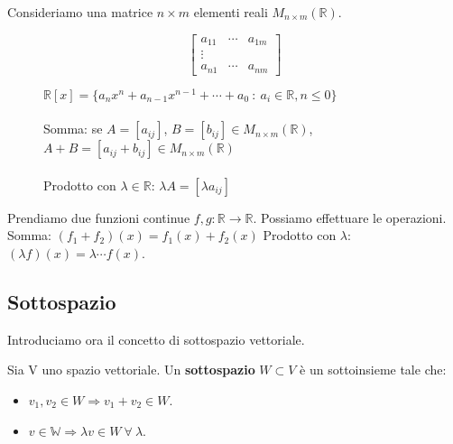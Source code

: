 \begin{example}
Consideriamo una matrice $n \times m$ elementi reali $M_{n\times m}(\mathbb{R})$.
\begin{figure}[h!]
    \begin{minipage}{.2\linewidth}
    \vspace{-10pt}
    \centering
    \[
    \begin{bmatrix}
    a_{11} & \cdots & a_{1m}\\
    \vdots \\
    a_{n1} & \cdots & a_{nm}
    \end{bmatrix}
    \]
    \end{minipage}
    \begin{minipage}{.75\linewidth}
    $\mathbb{R}[x] = \{a_nx^n + a_{n-1}x^{n-1} + \cdots + a_0 \: : \: a_i \in \mathbb{R}, n \leq 0\}$\\\\
    Somma: se $A = [a_{ij}]$, $B = [b_{ij}] \in M_{n\times m}(\mathbb{R})$, $A + B = [a_{ij} + b_{ij}] \in M_{n\times m}(\mathbb{R})$\\\\
    Prodotto con $\lambda \in \mathbb{R}$: $\lambda A = [\lambda a_{ij}]$
    \end{minipage}
\end{figure}
\end{example}

\begin{example}
Prendiamo due funzioni continue $f, g: \mathbb{R}\to \mathbb{R}$. Possiamo effettuare le operazioni.
Somma: $(f_1 + f_2)(x) = f_1(x) + f_2(x)$ \hspace{.3cm} Prodotto con $\lambda$: $(\lambda f)(x) = \lambda \cdots f(x)$.
\end{example}

\subsection{Sottospazio}
Introduciamo ora il concetto di sottospazio vettoriale.
\begin{definition}[Sottospazio]
Sia V uno spazio vettoriale. Un \textbf{sottospazio} $W \subset V$ è un sottoinsieme tale che:
\begin{itemize}
    \item $v_1, v_2 \in W \Longrightarrow v_1 + v_2 \in W$.
    \item $v \in \mathbb{W} \Longrightarrow \lambda v \in W \:\forall \: \lambda$.
\end{itemize}
\end{definition}

